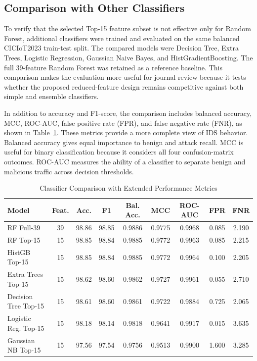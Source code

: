 \documentclass[journal]{IEEEtran}
\begin{document}
\subsection{Comparison with Other Classifiers}

To verify that the selected Top-15 feature subset is not effective only for Random Forest, additional classifiers were trained and evaluated on the same balanced CICIoT2023 train-test split. The compared models were Decision Tree, Extra Trees, Logistic Regression, Gaussian Naive Bayes, and HistGradientBoosting. The full 39-feature Random Forest was retained as a reference baseline. This comparison makes the evaluation more useful for journal review because it tests whether the proposed reduced-feature design remains competitive against both simple and ensemble classifiers.

In addition to accuracy and F1-score, the comparison includes balanced accuracy, MCC, ROC-AUC, false positive rate (FPR), and false negative rate (FNR), as shown in Table~\ref{tab:extended_classifier_comparison}. These metrics provide a more complete view of IDS behavior. Balanced accuracy gives equal importance to benign and attack recall. MCC is useful for binary classification because it considers all four confusion-matrix outcomes. ROC-AUC measures the ability of a classifier to separate benign and malicious traffic across decision thresholds.

\begin{table}[htbp]
\caption{Classifier Comparison with Extended Performance Metrics}
\label{tab:extended_classifier_comparison}
\centering
\scriptsize
\begin{tabular}{lcccccccc}
\toprule
\textbf{Model} & \textbf{Feat.} & \textbf{Acc.} & \textbf{F1} & \textbf{Bal. Acc.} & \textbf{MCC} & \textbf{ROC-AUC} & \textbf{FPR} & \textbf{FNR} \\
\midrule
RF Full-39 & 39 & 98.86 & 98.85 & 0.9886 & 0.9775 & 0.9968 & 0.085 & 2.190 \\
RF Top-15 & 15 & 98.85 & 98.84 & 0.9885 & 0.9772 & 0.9963 & 0.085 & 2.215 \\
HistGB Top-15 & 15 & 98.85 & 98.84 & 0.9885 & 0.9772 & 0.9964 & 0.100 & 2.205 \\
Extra Trees Top-15 & 15 & 98.62 & 98.60 & 0.9862 & 0.9727 & 0.9961 & 0.055 & 2.710 \\
Decision Tree Top-15 & 15 & 98.61 & 98.60 & 0.9861 & 0.9722 & 0.9884 & 0.725 & 2.065 \\
Logistic Reg. Top-15 & 15 & 98.18 & 98.14 & 0.9818 & 0.9641 & 0.9917 & 0.015 & 3.635 \\
Gaussian NB Top-15 & 15 & 97.56 & 97.54 & 0.9756 & 0.9513 & 0.9900 & 1.600 & 3.285 \\
\bottomrule
\end{tabular}
\end{table}
\end{document}
